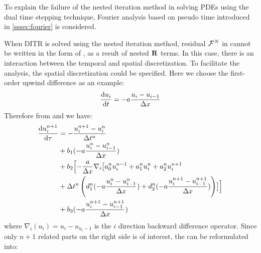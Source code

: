 To explain the failure of the nested iteration method
in solving PDEs using the dual time stepping technique, Fourier
analysis based on pseudo time introduced in \ref{sssec:fourier} is considered.

When DITR is solved using the nested iteration method,
residual $\mathcal{F}^N$ in 
cannot be written in the form of  ,
as a result of nested $\mathbf{R}$ terms.
In this case, there is an interaction
between the temporal and spatial discretization.
To facilitate the analysis, the spatial discretization
could be specified.
Here we choose the first-order
upwind difference as an example:
\begin{equation}
    \derivative{u_i}{t} = -a \frac{u_i - u_{i-1}}{\inc x}
    \label{eq:fdup1}
\end{equation}
Therefore from  and  we have:
\begin{equation}
    \begin{aligned}
        \frac{\dd u_i^{n+1}}{\dd \tau} & =
        -\frac{u_i^{n+1} - u_i^{n}}{{\Delta} t^n}      \\
                                       & +
        b_1 (-a\frac{u_i^{n}-u_{i-1}^{n}}{{\Delta} x}) \\
                                       & +
        b_2 \Bigl[-\frac{a}{{\Delta} x} \nabla_i
        \bigl[
        a^n_0u^{n - 1}_i +
        a^n_1u^{n}_i +
        a^n_2u^{n + 1}_i                           \\
                                       & +
        {\Delta} t^n
        \left(
        d^n_1(-a\frac{u_i^{n}-u_{i-1}^{n}}{{\Delta} x}) +
        d^n_2(-a\frac{u_i^{n+1}-u_{i-1}^{n+1}}{{\Delta} x})
        \right)\bigr]  \Bigr]                      \\
                                       & +
        b_3 (-a\frac{u_i^{n+1}-u_{i-1}^{n+1}}{{\Delta} x})
        \label{eq:nestedDITR_F1}
    \end{aligned}
\end{equation}
where $\nabla_i(u_i) = u_i - u_{u_i-1}$ is the $i$ direction
backward difference operator.
Since only $n+1$ related parts on
the right side is of interest,
the  can be reformulated into:
